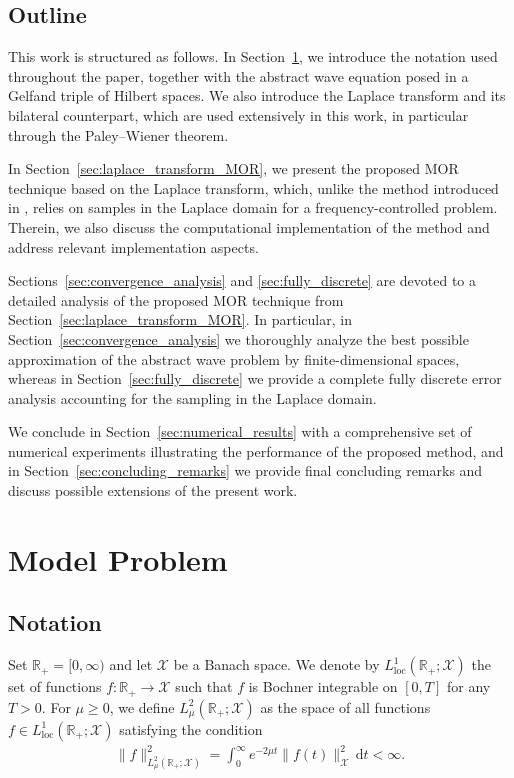 \subsection{Outline}
This work is structured as follows.
In Section~\ref{sec:model_problem}, we introduce the notation used throughout the paper,
together with the abstract wave equation posed in a Gelfand triple of Hilbert spaces.
We also introduce the Laplace transform and its bilateral counterpart, which are used
extensively in this work, in particular through the Paley--Wiener theorem.

In Section~\ref{sec:laplace_transform_MOR}, we present the proposed MOR technique based on
the Laplace transform, which, unlike the method introduced in \cite{HenriquezHesthaven2024},
relies on samples in the Laplace domain for a frequency-controlled problem.
Therein, we also discuss the computational implementation of the method and address
relevant implementation aspects.

Sections~\ref{sec:convergence_analysis} and \ref{sec:fully_discrete} are devoted to a
detailed analysis of the proposed MOR technique from
Section~\ref{sec:laplace_transform_MOR}.
In particular, in Section~\ref{sec:convergence_analysis} we thoroughly analyze the best
possible approximation of the abstract wave problem by finite-dimensional spaces,
whereas in Section~\ref{sec:fully_discrete} we provide a complete fully discrete error
analysis accounting for the sampling in the Laplace domain.

We conclude in Section~\ref{sec:numerical_results} with a comprehensive set of numerical
experiments illustrating the performance of the proposed method, and in
Section~\ref{sec:concluding_remarks} we provide final concluding remarks and discuss
possible extensions of the present work.

\section{Model Problem}
\label{sec:model_problem}
\subsection{Notation}
Set $\mathbb{R}_+=[0,\infty)$ and let $\mathcal{X}$ be a Banach space.
We denote by $L^1_{\text{loc}}(\mathbb{R}_+;\mathcal{X})$ the set of functions $f:\mathbb{R}_+\to\mathcal{X}$ such that $f$ is Bochner integrable on $[0,T]$ for any $T>0$.
For $\mu\geq 0$, we define $L^2_\mu(\mathbb{R}_+;\mathcal{X})$ 
as the space of all functions $f\in L^1_{\text{loc}}(\mathbb{R}_+;\mathcal{X})$ satisfying the condition
\begin{align}
	\|f\|_{L^2_\mu(\mathbb{R}_+;\mathcal{X})}^2 
	=
	\int_0^\infty e^{-2\mu t} \|f(t)\|_{\mathcal{X}}^2\,\textrm{d}t
	<
	\infty.
\end{align}

